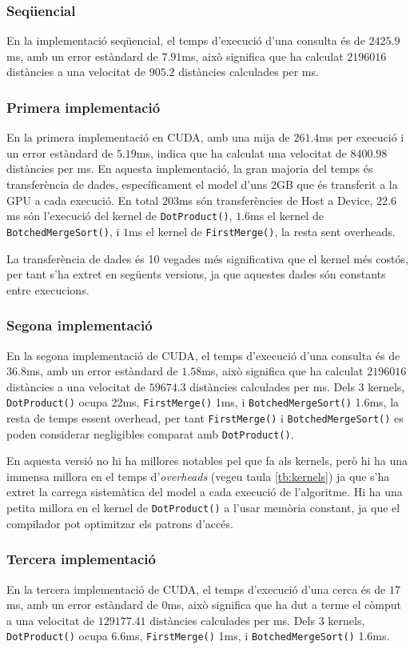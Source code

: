 \documentclass[catalan,10pt,a4paper]{article}
\begin{document}
\subsubsection*{Seqüencial}
En la implementació seqüencial, el temps d'execució d'una consulta és de $2425.9$ms, amb un error estàndard de $7.91$ms, això significa que ha calculat $2196016$ distàncies a una velocitat de $905.2$ distàncies calculades per ms. 
\subsubsection*{Primera implementació}
En la primera implementació en CUDA, amb una mija de $261.4$ms per execució i un error estàndard de $5.19$ms, indica que ha calculat una velocitat de $8400.98$ distàncies per ms. En aquesta implementació, la gran majoria del temps és transferència de dades, específicament el model d'uns 2GB que és transferit a la GPU a cada execució. En total $203$ms són transferències de Host a Device, $22.6$ms són l'execució del kernel de \verb|DotProduct()|, $1.6$ms el kernel de \verb|BotchedMergeSort()|, i $1$ms el kernel de \verb|FirstMerge()|, la resta sent overheads.

La transferència de dades és 10 vegades més significativa que el kernel més costós, per tant s'ha extret en següents versions, ja que aquestes dades són constants entre execucions.
\subsubsection*{Segona implementació}
En la segona implementació de CUDA, el temps d'execució d'una consulta és de $36.8$ms, amb un error estàndard de $1.58$ms, això significa que ha calculat $2196016$ distàncies a una velocitat de $59674.3$ distàncies calculades per ms. Dels 3 kernels, \verb|DotProduct()| ocupa 22ms, \verb|FirstMerge()| 1ms, i \verb|BotchedMergeSort()| 1.6ms, la resta de temps essent overhead, per tant \verb|FirstMerge()| i \verb|BotchedMergeSort()| es poden considerar negligibles comparat amb \verb|DotProduct()|.

En aquesta versió no hi ha millores notables pel que fa als kernels, però hi ha una immensa millora en el temps d'\textit{overheads} (vegeu taula \ref{tb:kernels})  ja que s'ha extret la carrega sistemàtica del model a cada execució de l'algoritme. Hi ha una petita millora en el kernel de \verb|DotProduct()| a l'usar memòria constant, ja que el compilador pot optimitzar els patrons d'accés.
\subsubsection*{Tercera implementació}
En la tercera implementació de CUDA, el temps d'execució d'una cerca és de $17$ms, amb un error estàndard de $0$ms, això significa que ha dut a terme el còmput a una velocitat de $129177.41$ distàncies calculades per ms. Dels 3 kernels, \verb|DotProduct()| ocupa 6.6ms, \verb|FirstMerge()| 1ms, i \verb|BotchedMergeSort()| 1.6ms. 
\end{document}
